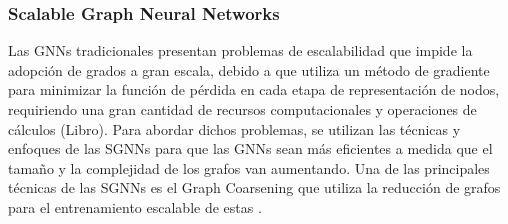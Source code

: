 \subsubsection{Scalable Graph Neural Networks}
Las GNNs tradicionales presentan problemas de escalabilidad que impide la adopción de grados a gran escala, debido a que utiliza un método de gradiente para minimizar la función de pérdida en cada etapa de representación de nodos, requiriendo una gran cantidad de recursos computacionales y operaciones de cálculos (Libro). Para abordar dichos problemas, se utilizan las técnicas y enfoques de las SGNNs para que las GNNs sean más eficientes a medida que el tamaño y la complejidad de los grafos van aumentando. Una de las principales técnicas de las SGNNs es el Graph Coarsening que utiliza la reducción de grafos para el entrenamiento escalable de estas \parencite{huang2021scaling}.

